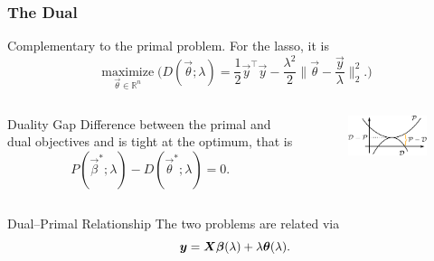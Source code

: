 \documentclass[10pt]{beamer}
\begin{document}
\begin{frame}
  \frametitle{The Dual}
  Complementary to the primal problem. For the lasso, it is
  \[
    \operatorname*{maximize}_{\vec{\theta} \in \mathbb{R}^n}
    \Bigg(
    D(\vec{\theta}; \lambda) = \frac 1 2 \vec{y}^\intercal \vec{y} -
    \frac{\lambda^2}{2} \Big\lVert \vec{\theta} - \frac{\vec{y}}{\lambda} \Big\rVert_2^2.
    \Bigg)
  \]
  \pause
  \begin{columns}
    \begin{column}[t]{0.45\linewidth}
      \begin{block}{Duality Gap}
        Difference between the primal and dual
        objectives and is tight at the optimum, that is
        \[
          P(\vec{\beta}^*; \lambda) - D(\vec{\theta}^*; \lambda) = 0.
        \]
      \end{block}
    \end{column}
    \begin{column}[t]{0.45\linewidth}
      \begin{figure}[htpb]
        \centering
        \includegraphics[]{figures/paper2-duality-gap.pdf}
      \end{figure}
    \end{column}
  \end{columns}
  \medskip

  \pause

  \begin{block}{Dual--Primal Relationship}
    The two problems are related via
    \[
      \bm{y} = \bm{X}\bm{\beta}(\lambda) + \lambda \bm{\theta}(\lambda).
    \]
  \end{block}
\end{frame}
\end{document}
